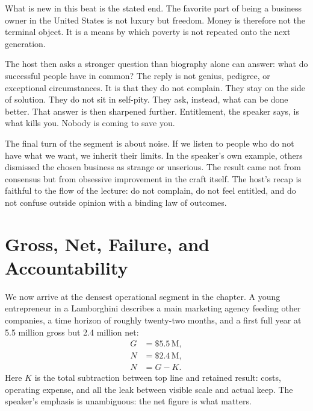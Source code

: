 What is new in this beat is the stated end. The favorite part of being a business owner in the United States is not luxury but freedom. Money is therefore not the terminal object. It is a means by which poverty is not repeated onto the next generation.

The host then asks a stronger question than biography alone can answer: what do successful people have in common? The reply is not genius, pedigree, or exceptional circumstances. It is that they do not complain. They stay on the side of solution. They do not sit in self-pity. They ask, instead, what can be done better. That answer is then sharpened further. Entitlement, the speaker says, is what kills you. Nobody is coming to save you.

The final turn of the segment is about noise. If we listen to people who do not have what we want, we inherit their limits. In the speaker's own example, others dismissed the chosen business as strange or unserious. The result came not from consensus but from obsessive improvement in the craft itself. The host's recap is faithful to the flow of the lecture: do not complain, do not feel entitled, and do not confuse outside opinion with a binding law of outcomes.

\section{Gross, Net, Failure, and Accountability}

We now arrive at the densest operational segment in the chapter. A young entrepreneur in a Lamborghini describes a main marketing agency feeding other companies, a time horizon of roughly twenty-two months, and a first full year at \text{\$}5.5 million gross but \text{\$}2.4 million net:
\begin{align}
G &= \text{\$}5.5\,\mathrm{M},\\
N &= \text{\$}2.4\,\mathrm{M},\\
N &= G - K.
\end{align}
Here \(K\) is the total subtraction between top line and retained result: costs, operating expense, and all the leak between visible scale and actual keep. The speaker's emphasis is unambiguous: the net figure is what matters.

